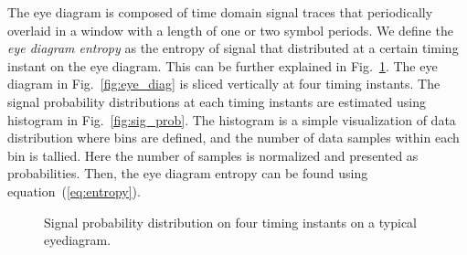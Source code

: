 \documentclass[journal,comsoc, onecolumn, 12pt,draftclsnofoot]{IEEEtran} %
\begin{document}
The eye diagram is composed of time domain signal traces that periodically overlaid in a window with a length of one or two symbol periods.
We define the \textit{eye diagram entropy} as the entropy of signal that distributed at a certain timing instant on the eye diagram. 
This can be further explained in Fig.~\ref{fig:eye_ent}.
The eye diagram in Fig.~\ref{fig:eye_diag} is sliced vertically at four timing instants.
The signal probability distributions at each timing instants are estimated using histogram in Fig.~\ref{fig:sig_prob}.
The histogram is a simple visualization of data distribution where bins are defined, and the number of data samples within each bin is tallied. 
Here the number of samples is normalized and presented as probabilities.
Then, the eye diagram entropy can be found using equation~(\ref{eq:entropy}). 
\begin{figure}[htbp]
\centering
{}
\caption{Signal probability distribution on four timing instants on a typical eyediagram.}
\label{fig:eye_ent} %
\end{figure}
\end{document}
